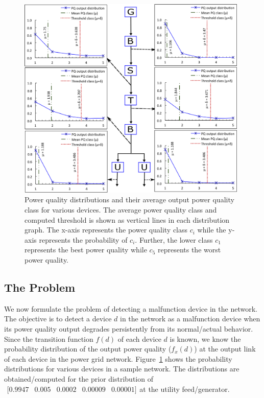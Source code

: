 \begin{figure}[!t]
\centering
\includegraphics[width=0.98\textwidth]{PQOutputDistribution}
\caption{Power quality distributions and their average output power quality class for various devices. The average power quality class and computed threshold is shown as vertical lines in each  distribution graph. The x-axis represents the power quality class $c_i$ while the y-axis represents the probability of $c_i$. Further, the lower class $c_1$ represents the best power quality while $c_5$ represents the worst power quality.}
\label{fig:outputPQDistributions}
\end{figure}

\subsection{The Problem}
We now formulate the problem of detecting a malfunction device in the network. The objective is to detect a device $d$ in the network as a malfunction device when its power quality output degrades persistently from its normal/actual behavior. Since the transition function $f(d)$ of each device $d$ is known, we know the probability distribution of the output power quality ($f_x\left(d\right)$) at the output link of each device in the power grid network. Figure~\ref{fig:outputPQDistributions} shows the probability distributions for various devices in a sample network. The distributions are obtained/computed for the prior distribution of$\begin{array}{ccccc}[0.9947 & 0.005 & 0.0002 & 0.00009 & 0.00001]\end{array}$at the utility feed/generator.

